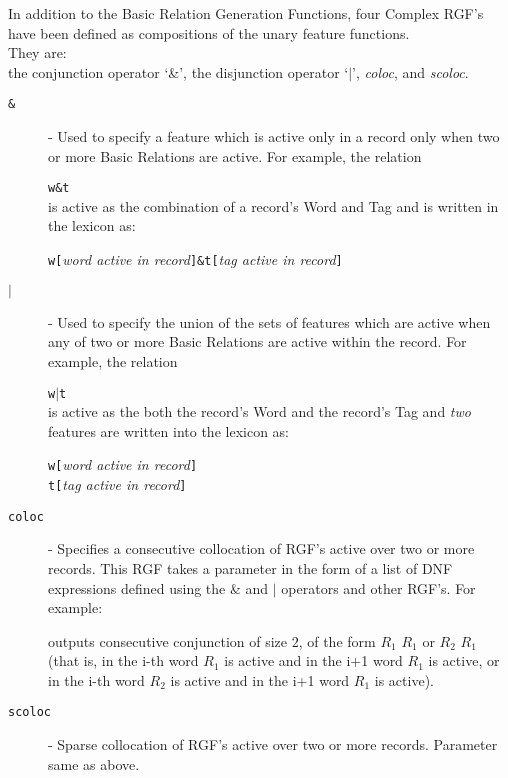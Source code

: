 \documentclass[11pt]{article}
\begin{document}
In addition to the Basic Relation Generation Functions, four Complex RGF's have been
defined as compositions of the unary feature functions.  \\ They are: \\
the conjunction operator `\&', the disjunction operator `$|$', {\em coloc},
and {\em scoloc}.

\begin{description}

\item[{\tt \&}] - Used to specify a feature which is active only in a
record only when two or more Basic Relations are active.  For example, the
relation

{\tt w\&t} \\
is active as the combination of a record's Word and Tag and is written in the
lexicon as: 

{\tt w[}{\em word active in record}{\tt]\&t[}{\em tag active in record}{\tt]}

\item[{\tt $|$}] - Used to specify the union of the sets of features which are
active when any of two or more Basic Relations are active within the record.  
For example, the relation

{\tt w$|$t} \\
is active as the both the record's Word and the record's Tag and {\em two}
features are written into the lexicon as: 

{\tt w[}{\em word active in record}{\tt]} \\
{\tt t[}{\em tag active in record}{\tt]}

\item[{\tt coloc}] - Specifies a consecutive collocation of RGF's active 
over two or more records.  This RGF takes a parameter in the form of a 
list of DNF expressions defined using the \& and $|$ operators and other 
RGF's.  For example:


\noindent outputs consecutive conjunction of size $2$, of the form $R_1$ $R_1$ or
$R_2$ $R_1$ (that is, in the i-th word $R_1$ is active and in the i+1 word $R_1$ is
active, or in the i-th word $R_2$ is active and in the i+1 word $R_1$ is
active). 

\item[{\tt scoloc}] - Sparse collocation of RGF's active over two or more
records.  Parameter same as above.  

\end{description}
\end{document}
